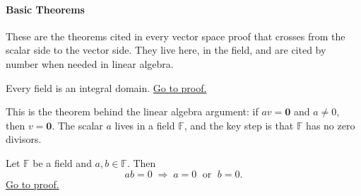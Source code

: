 \paragraph{Basic Theorems}

\begin{remark}
These are the theorems cited in every vector space proof that crosses
from the scalar side to the vector side. They live here, in the field,
and are cited by number when needed in linear algebra.
\end{remark}

\begin{proposition}
\label{prop:field-is-domain}
Every field is an integral domain.
\hyperref[prf:field-is-domain]{Go to proof.}
\end{proposition}

\begin{remark*}
\end{remark*}



\begin{remark}
This is the theorem behind the linear algebra argument:
if $av = \mathbf{0}$ and $a \neq 0$, then $v = \mathbf{0}$.
The scalar $a$ lives in a field $\mathbb{F}$, and the key step
is that $\mathbb{F}$ has no zero divisors.
\end{remark}

\begin{proposition}
\label{prop:field-zero-product}
Let $\mathbb{F}$ be a field and $a, b \in \mathbb{F}$. Then
\[
ab = 0 \;\Longrightarrow\; a = 0 \;\text{ or }\; b = 0.
\]
\hyperref[prf:field-zero-product]{Go to proof.}
\end{proposition}

\begin{remark*}
\end{remark*}




